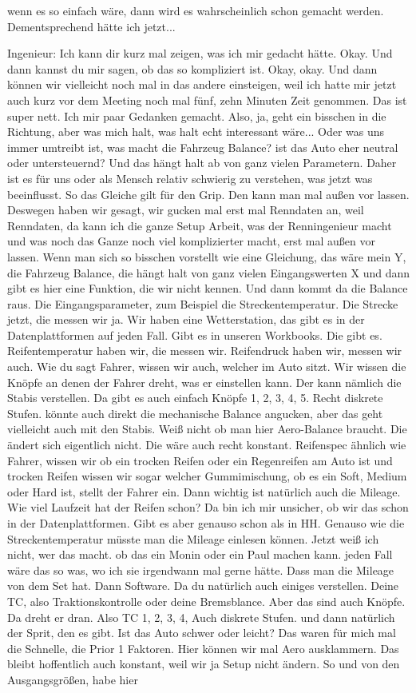 wenn es so einfach wäre, dann wird es wahrscheinlich schon gemacht werden. Dementsprechend hätte ich jetzt...  


Ingenieur:
Ich kann dir kurz mal zeigen, was ich mir gedacht hätte. Okay. Und dann kannst du mir sagen, ob das so kompliziert ist. Okay, okay. Und dann können wir vielleicht noch mal in das andere einsteigen, weil ich hatte mir jetzt auch kurz vor dem Meeting noch mal fünf, zehn Minuten Zeit genommen. Das ist super nett. Ich mir paar Gedanken gemacht. Also, ja, geht ein bisschen in die Richtung, aber was mich halt, was halt echt interessant wäre...  Oder was uns immer umtreibt ist, was macht die Fahrzeug Balance? ist das Auto eher neutral oder untersteuernd? Und das hängt halt ab von ganz vielen Parametern. Daher ist es für uns oder als Mensch relativ schwierig zu verstehen, was jetzt was beeinflusst. So das Gleiche gilt für den Grip. Den kann man mal außen vor lassen.  Deswegen haben wir gesagt, wir gucken mal erst mal Renndaten an, weil Renndaten, da kann ich die ganze Setup Arbeit, was der Renningenieur macht und was noch das Ganze noch viel komplizierter macht, erst mal außen vor lassen. Wenn man sich so bisschen vorstellt wie eine Gleichung, das wäre mein Y, die Fahrzeug Balance, die hängt halt von ganz vielen Eingangswerten X und dann gibt es hier eine Funktion, die wir nicht kennen. Und dann kommt da die Balance raus.  Die Eingangsparameter, zum Beispiel die Streckentemperatur. Die Strecke jetzt, die messen wir ja. Wir haben eine Wetterstation, das gibt es in der Datenplattformen auf jeden Fall. Gibt es in unseren Workbooks. Die gibt es. Reifentemperatur haben wir, die messen wir. Reifendruck haben wir, messen wir auch. Wie du sagt Fahrer, wissen wir auch, welcher im Auto sitzt. Wir wissen die Knöpfe an denen der Fahrer dreht, was er einstellen kann. Der kann nämlich die Stabis verstellen. Da gibt es auch einfach Knöpfe 1, 2, 3, 4, 5. Recht diskrete Stufen. könnte auch direkt die mechanische Balance angucken, aber das geht vielleicht auch mit den Stabis. Weiß nicht ob man hier Aero-Balance braucht. Die ändert sich eigentlich nicht. Die wäre auch recht konstant. Reifenspec ähnlich wie Fahrer, wissen wir ob ein trocken Reifen oder ein Regenreifen am Auto ist und trocken Reifen wissen wir sogar welcher Gummimischung, ob es ein Soft, Medium oder Hard ist, stellt der Fahrer ein. Dann wichtig ist natürlich auch die Mileage. Wie viel Laufzeit hat der Reifen schon? Da bin ich mir unsicher, ob wir das schon in der Datenplattformen. Gibt es aber genauso schon als in  HH. Genauso wie die Streckentemperatur müsste man die Mileage einlesen können. Jetzt weiß ich nicht, wer das macht. ob das ein Monin oder ein Paul machen kann. jeden Fall wäre das so was, wo ich sie irgendwann mal gerne hätte. Dass man die Mileage von dem Set hat. Dann Software. Da du natürlich auch einiges verstellen. Deine TC, also Traktionskontrolle oder deine Bremsblance. Aber das sind auch Knöpfe. Da dreht er dran. Also TC 1, 2, 3, 4, Auch diskrete Stufen. und dann natürlich der Sprit, den es gibt. Ist das Auto schwer oder leicht? Das waren für mich mal die Schnelle, die Prior 1 Faktoren. Hier können wir mal Aero ausklammern. Das bleibt hoffentlich auch konstant, weil wir ja Setup nicht ändern.  So und von den Ausgangsgrößen, habe hier 